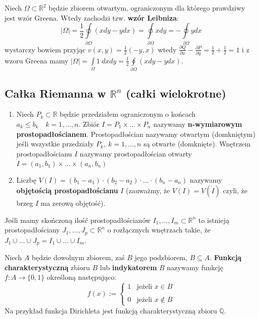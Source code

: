 \begin{wnsk}
	Niech $\Omega\subset\mathbb{R}^{2}$ będzie zbiorem otwartym, ograniczonym dla którego prawdziwy jest wzór Greena. Wtedy zachodzi tzw. \textbf{wzór Leibniza}:
	$$|\Omega|=\frac{1}{2}\oint\limits_{\partial \Omega}(xdy-ydx)=\oint\limits_{\partial \Omega}xdy=-\oint\limits_{\partial \Omega}ydx$$
	wystarczy bowiem przyjąc $v(x,y)=\frac{1}{2}(-y,x)$ wtedy $\displaystyle\frac{\partial Q}{\partial x}-\frac{\partial P}{\partial y}=\frac{1}{2}+\frac{1}{2}=1$ i z wzoru Greena mamy $\displaystyle|\Omega|=\int\limits_{\Omega}1\ dxdy=\frac{1}{2}\oint\limits_{\partial \Omega}(xdy-ydx)$.
\end{wnsk}

\subsection{Całka Riemanna w $\mathbb{R}^{n}$ (całki wielokrotne)}

\begin{df}
	\begin{enumerate}
		\item
		Niech $P_{k}\subset\mathbb{R}$ będzie przedziałem ograniczonym o końcach \linebreak[4]$a_{k}\leq b_{k}\quad k=1,\ldots,n$. Zbiór $I=P_{1}\times\ldots\times P_{n}$ nazywamy \textbf{n-wymiarowym} \textbf{prostopadłościanem}. Prostopadłościan nazywamy otwartym (domkniętym) jeśli wszystkie przedziały $P_{k},\: k=1,\ldots,n$ są otwarte (domknięte). Wnętrzem prostopadłościanu $I$ nazywamy prostopadłościan otwarty $\dot{I}=(a_{1},b_{1})\times\ldots\times(a_{n},b_{n})$
		\item
		Liczbę $V(I)=(b_{1}-a_{1})\cdot(b_{2}-a_{2})\cdot\ldots\cdot(b_{n}-a_{n})$ nazywamy \textbf{objętością prostopadłościanu} $I$ (zauważmy, że $V(I)=V(\dot{I})$ czyli, że brzeg $I$ ma zerową objętość).
	\end{enumerate}
\end{df}

\begin{ft}
	Jeśli mamy skończoną ilość prostopadłościanów $I_{1},\ldots,I_{m}\subset\mathbb{R}^{n}$ to istnieją prostopadłościany $J_{1},\ldots,J_{p}\subset\mathbb{R}^{n}$ o rozłącznych wnętrzach takie, że $J_{1}\cup\ldots\cup J_{p}=I_{1}\cup\ldots\cup I_{m}$.
\end{ft}

\begin{df}
	Niech $A$ będzie dowolnym zbiorem, zaś $B$ jego podzbiorem, $B\subseteq A$. \textbf{Funkcją charakterystyczną} zbioru $B$ lub \textbf{indykatorem} $B$ nazywamy funkcję $f:A\rightarrow \{0,1\}$ określoną następująco:
	\begin{displaymath}
	f(x):=\left\{\begin{array}{ll}
	1  & \textrm{jeżeli $x\in B$}
	\\
	\\0 & \textrm{jeżeli $x\notin B$}
	\end{array} \right.
	\end{displaymath}
	Na przykład funkcja Dirichleta jest funkcją charakterystyczną zbioru $\mathbb{Q}$.
\end{df}

